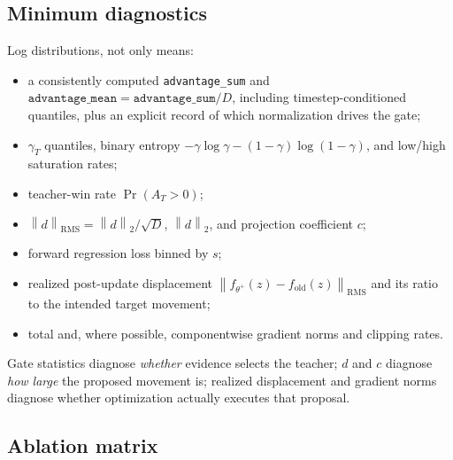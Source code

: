 \documentclass[11pt,a4paper]{article}
\newcommand{\norm}[1]{\left\lVert #1\right\rVert}
\newcommand{\RMS}{\operatorname{RMS}}
\newcommand{\old}{\mathrm{old}}
\theoremstyle{plain}
\theoremstyle{definition}
\begin{document}
\subsection{Minimum diagnostics}

Log distributions, not only means:
\begin{itemize}[leftmargin=1.5em]
\item a consistently computed \texttt{advantage\_sum} and
      $\texttt{advantage\_mean}=\texttt{advantage\_sum}/D$, including timestep-conditioned
      quantiles, plus an explicit record of which normalization drives the gate;
\item $\gamma_T$ quantiles, binary entropy
      $-\gamma\log\gamma-(1-\gamma)\log(1-\gamma)$, and low/high saturation rates;
\item teacher-win rate $\Pr(A_T>0)$;
\item $\norm d_{\RMS}=\norm d_2/\sqrt D$, $\norm d_2$, and projection coefficient $c$;
\item forward regression loss binned by $s$;
\item realized post-update displacement
      $\norm{f_{\theta^+}(z)-f_{\old}(z)}_{\RMS}$ and its ratio to the intended target movement;
\item total and, where possible, componentwise gradient norms and clipping rates.
\end{itemize}
Gate statistics diagnose \emph{whether} evidence selects the teacher; $d$ and $c$ diagnose
\emph{how large} the proposed movement is; realized displacement and gradient norms diagnose
whether optimization actually executes that proposal.

\subsection{Ablation matrix}
\end{document}
